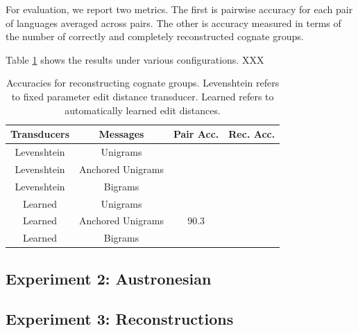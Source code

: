\documentclass[11pt,a4paper]{article}
\begin{document}
For evaluation, we report two metrics. The first is pairwise accuracy
for each pair of languages averaged across pairs. The other is
accuracy measured in terms of the number of correctly and completely
reconstructed cognate groups.

Table \ref{tbl:exp1} shows the results under various configurations. XXX

\begin{table}
  \centering
  \begin{tabular}{|c|c|c|c|}
    Transducers & Messages & Pair Acc. & Rec. Acc.\\
    \hline
    \hline
    Levenshtein&Unigrams & & \\
    Levenshtein&Anchored Unigrams & & \\
    Levenshtein&Bigrams & & \\
    \hline 
    Learned&Unigrams & & \\
    Learned&Anchored Unigrams & 90.3  & \\
    Learned&Bigrams & & \\
  \end{tabular}
  \caption{Accuracies for reconstructing cognate groups. Levenshtein
  refers to fixed parameter edit distance transducer. Learned refers
  to automatically learned edit distances.}
  \label{tbl:exp1}
\end{table}

\subsection{Experiment 2: Austronesian}

\subsection{Experiment 3: Reconstructions}
\end{document}
